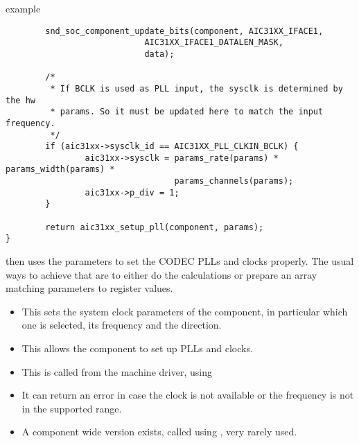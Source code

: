 \begin{frame}[fragile]{ example}
  \begin{block}{}
    \fontsize{8}{8}\selectfont
    \begin{verbatim}
        snd_soc_component_update_bits(component, AIC31XX_IFACE1,
                            AIC31XX_IFACE1_DATALEN_MASK,
                            data);

        /*
         * If BCLK is used as PLL input, the sysclk is determined by the hw
         * params. So it must be updated here to match the input frequency.
         */
        if (aic31xx->sysclk_id == AIC31XX_PLL_CLKIN_BCLK) {
                aic31xx->sysclk = params_rate(params) * params_width(params) *
                                  params_channels(params);
                aic31xx->p_div = 1;
        }

        return aic31xx_setup_pll(component, params);
}
    \end{verbatim}
  \end{block}
   then uses the parameters to set the CODEC
  PLLs and clocks properly. The usual ways to achieve that are to
  either do the calculations or prepare an array matching parameters
  to register values.
\end{frame}

\begin{frame}{}
  \begin{itemize}
  \item This sets the system clock parameters of the component, in
    particular which one is selected, its frequency and the direction.
  \item This allows the component to set up PLLs and clocks.
  \item This is called from the machine driver, using
  \item It can return an error in case the clock is not available or
    the frequency is not in the supported range.
  \item A component wide version exists, called using
    , very rarely used.
  \end{itemize}
\end{frame}


